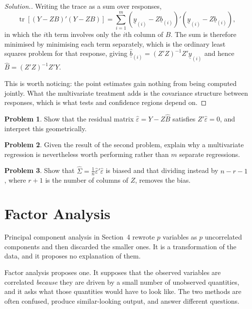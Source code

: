 \documentclass[11pt,a4paper]{article}
\theoremstyle{definition}
\newtheorem{problemx}{Problem}[section]
\newenvironment{problem}{\begin{problemx}}{\end{problemx}}
\newenvironment{solution}
  {\renewcommand{\qedsymbol}{}\begin{proof}[\textit{Solution}.]}
  {\end{proof}}
\begin{document}
\begin{solution}
Writing the trace as a sum over responses,
$$\operatorname{tr}\left[(Y-ZB)'(Y-ZB)\right]
= \sum^{m}_{i=1}\left(\underline{y}_{(i)}-Z\underline{b}_{(i)}\right)'
\left(\underline{y}_{(i)}-Z\underline{b}_{(i)}\right),$$
in which the $i$th term involves only the $i$th column of $B$. The sum is
therefore minimised by minimising each term separately, which is the ordinary
least squares problem for that response, giving
$\widehat{\underline{b}}_{(i)} = (Z'Z)^{-1}Z'\underline{y}_{(i)}$ and hence
$\widehat{B} = (Z'Z)^{-1}Z'Y$.

This is worth noticing: the point estimates gain nothing from being computed
jointly. What the multivariate treatment adds is the covariance structure
between responses, which is what tests and confidence regions depend on.
\end{solution}

\begin{problem}
Show that the residual matrix $\widehat{\varepsilon} = Y - Z\widehat{B}$
satisfies $Z'\widehat{\varepsilon}=0$, and interpret this geometrically.
\end{problem}

\begin{problem}
Given the result of the second problem, explain why a multivariate regression
is nevertheless worth performing rather than $m$ separate regressions.
\end{problem}

\begin{problem}
Show that $\widehat{\Sigma} = \tfrac{1}{n}\widehat{\varepsilon}'\widehat{\varepsilon}$
is biased and that dividing instead by $n-r-1$, where $r+1$ is the number of
columns of $Z$, removes the bias.
\end{problem}

\section{Factor Analysis}

Principal component analysis in Section~4 rewrote $p$ variables as $p$
uncorrelated components and then discarded the smaller ones. It is a
transformation of the data, and it proposes no explanation of them.

Factor analysis proposes one. It supposes that the observed variables are
correlated \emph{because} they are driven by a small number of unobserved
quantities, and it asks what those quantities would have to look like. The two
methods are often confused, produce similar-looking output, and answer different
questions.
\end{document}
